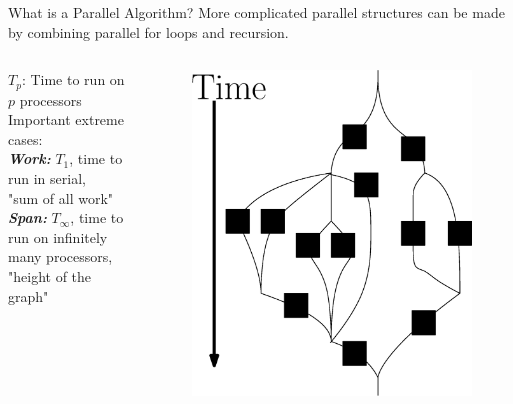 \documentclass[xcolor=x11names, svgnames, rgb]{beamer}
\newcommand{\defn}[1]       {{\textit{\textbf{\boldmath #1}}}}
\begin{document}
\begin{frame}[t]{What is a Parallel Algorithm?}
	More complicated parallel structures can be made by combining parallel for loops and recursion.
	\begin{columns}[T] %
	\begin{column}{.45\textwidth}
		\vspace{0.5cm}
		\defn{$T_p$}: Time to run on $p$ processors\\
		\vspace{0.5cm}
		Important extreme cases:\\
		\vspace{0.1cm}
		\defn{Work:} $T_1$, time to run in serial, \\ "sum of all work"\\
		\vspace{0.15cm}
		\defn{Span:} $T_\infty$, time to run on infinitely many processors,\\ 
		"height of the graph"
	\end{column}
	\hfill
	\begin{column}{.60\textwidth}
		\begin{figure}
			\includegraphics[width=0.8\linewidth]{imgs/altParallelForLoopComposition.eps}
		\end{figure}
	\end{column}
	\end{columns}
\end{frame}
\end{document}
